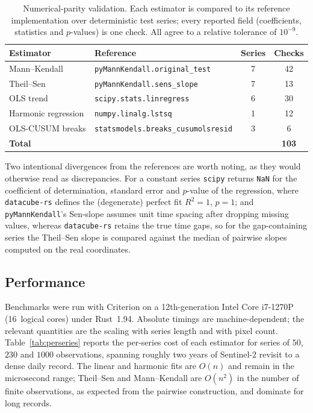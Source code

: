 \documentclass[review]{elsarticle}
\begin{document}
\begin{table}[t]
\centering
\caption{Numerical-parity validation. Each estimator is compared to its
reference implementation over deterministic test series; every reported field
(coefficients, statistics and $p$-values) is one check. All agree to a relative
tolerance of $10^{-9}$.}
\label{tab:parity}
\small
\begin{tabular}{@{}llcc@{}}
\toprule
Estimator & Reference & Series & Checks \\
\midrule
Mann--Kendall      & \texttt{pyMannKendall.original\_test} & 7 & 42 \\
Theil--Sen         & \texttt{pyMannKendall.sens\_slope}    & 7 & 13 \\
OLS trend          & \texttt{scipy.stats.linregress}       & 6 & 30 \\
Harmonic regression& \texttt{numpy.linalg.lstsq}           & 1 & 12 \\
OLS-CUSUM breaks   & \texttt{statsmodels.breaks\_cusumolsresid} & 3 & 6 \\
\midrule
\textbf{Total}     &                                       &   & \textbf{103} \\
\bottomrule
\end{tabular}
\end{table}

Two intentional divergences from the references are worth noting, as they would
otherwise read as discrepancies. For a constant series \texttt{scipy} returns
\texttt{NaN} for the coefficient of determination, standard error and $p$-value
of the regression, where \texttt{datacube-rs} defines the (degenerate) perfect
fit $R^2 = 1$, $p = 1$; and \texttt{pyMannKendall}'s Sen-slope assumes unit time
spacing after dropping missing values, whereas \texttt{datacube-rs} retains the
true time gaps, so for the gap-containing series the Theil--Sen slope is compared
against the median of pairwise slopes computed on the real coordinates.

\subsection{Performance}
\label{sec:perf}
Benchmarks were run with Criterion on a 12th-generation Intel Core i7-1270P
(16~logical cores) under Rust~1.94. Absolute timings are machine-dependent; the
relevant quantities are the scaling with series length and with pixel count.
Table~\ref{tab:perseries} reports the per-series cost of each estimator for
series of $50$, $230$ and $1000$ observations, spanning roughly two years of
Sentinel-2 revisit to a dense daily record. The linear and harmonic fits are
$O(n)$ and remain in the microsecond range; Theil--Sen and Mann--Kendall are
$O(n^2)$ in the number of finite observations, as expected from the pairwise
construction, and dominate for long records.
\end{document}
